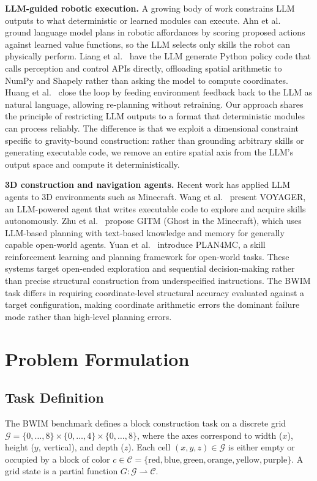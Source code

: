 \documentclass{article}
\begin{document}
\textbf{LLM-guided robotic execution.}
A growing body of work constrains LLM outputs to what deterministic or
learned modules can execute. Ahn et al.~\cite{saycan2022} ground
language model plans in robotic affordances by scoring proposed actions
against learned value functions, so the LLM selects only skills the
robot can physically perform. Liang et al.~\cite{cap2022} have the LLM
generate Python policy code that calls perception and control APIs
directly, offloading spatial arithmetic to NumPy and Shapely rather
than asking the model to compute coordinates. Huang et al.~
\cite{innermonologue2022} close the loop by feeding environment
feedback back to the LLM as natural language, allowing re-planning
without retraining. Our approach shares the principle of restricting LLM
outputs to a format that deterministic modules can process reliably. The
difference is that we exploit a dimensional constraint specific to
gravity-bound construction: rather than grounding arbitrary skills or
generating executable code, we remove an entire spatial axis from the
LLM's output space and compute it deterministically.

\textbf{3D construction and navigation agents.}
Recent work has applied LLM agents to 3D environments such as Minecraft.
Wang et al.~\cite{voyager2023} present VOYAGER, an LLM-powered agent that
writes executable code to explore and acquire skills autonomously. Zhu et
al.~\cite{gitm2023} propose GITM (Ghost in the Minecraft), which uses
LLM-based planning with text-based knowledge and memory for generally
capable open-world agents. Yuan et al.~\cite{plan4mc2023} introduce
PLAN4MC, a skill reinforcement learning and planning framework for
open-world tasks. These systems target open-ended exploration and sequential
decision-making rather than precise structural construction from
underspecified instructions. The BWIM task differs in requiring
coordinate-level structural accuracy evaluated against a target
configuration, making coordinate arithmetic errors the dominant failure mode
rather than high-level planning errors.

\section{Problem Formulation}

\subsection{Task Definition}

The BWIM benchmark defines a block construction task on a discrete grid
$\mathcal{G} = \{0, \ldots, 8\} \times \{0, \ldots, 4\} \times \{0, \ldots, 8\}$,
where the axes correspond to width ($x$), height ($y$, vertical), and depth ($z$).
Each cell $(x, y, z) \in \mathcal{G}$ is either empty or occupied by a block
of color $c \in \mathcal{C} = \{\text{red}, \text{blue}, \text{green},
\text{orange}, \text{yellow}, \text{purple}\}$. A grid state is a partial
function $G : \mathcal{G} \rightharpoonup \mathcal{C}$.
\end{document}
